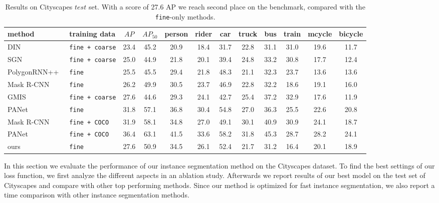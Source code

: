 \begin{table*}[ht!]
    \small
    \centering
    \begin{tabular}[t]{l|l|c c | c c c c c c c c}
         method & training data & $AP$ & $AP_{50}$ & person & rider & car & truck & bus & train & mcycle & bicycle \\
         \hline
         DIN~\cite{arnab2017pixelwise}          & \texttt{fine\,+\,coarse}  & 23.4 & 45.2 & 20.9 & 18.4 & 31.7 & 22.8 & 31.1 & 31.0 & 19.6 & 11.7 \\ 
         SGN~\cite{liu2017sgn}                  & \texttt{fine\,+\,coarse}  & 25.0 & 44.9 & 21.8 & 20.1 & 39.4 & 24.8 & 33.2 & 30.8 & 17.7 & 12.4 \\
         PolygonRNN++~\cite{acuna2018efficient} & \texttt{fine}             & 25.5 & 45.5 & 29.4 & 21.8 & 48.3 & 21.1 & 32.3 & 23.7 & 13.6 & 13.6 \\ 
         Mask R-CNN~\cite{he2017mask}           & \texttt{fine}             & 26.2 & 49.9 & 30.5 & 23.7 & 46.9 & 22.8 & 32.2 & 18.6 & 19.1 & 16.0 \\
         GMIS~\cite{liu2018affinity}            & \texttt{fine\,+\,coarse}  & 27.6 & 44.6 & 29.3 & 24.1 & 42.7 & 25.4 & 37.2 & 32.9 & 17.6 & 11.9 \\
         PANet~\cite{liu2018path}               & \texttt{fine}             & 31.8 & 57.1 & 36.8 & 30.4 & 54.8 & 27.0 & 36.3 & 25.5 & 22.6 & 20.8 \\
         Mask R-CNN~\cite{he2017mask}           & \texttt{fine\,+\,COCO}    & 31.9 & 58.1 & 34.8 & 27.0 & 49.1 & 30.1 & 40.9 & 30.9 & 24.1 & 18.7 \\   
         PANet~\cite{liu2018path}               & \texttt{fine\,+\,COCO}    & 36.4 & 63.1 & 41.5 & 33.6 & 58.2 & 31.8 & 45.3 & 28.7 & 28.2 & 24.1 \\
         \hline
         ours           & \texttt{fine}             & 27.6 & 50.9 & 34.5 & 26.1 & 52.4 & 21.7 & 31.2 & 16.4 & 20.1 & 18.9 \\
    \end{tabular}
    \vspace{3mm}
    \caption{Results on Cityscapes $test$ set. With a score of 27.6 AP we reach second place on the benchmark, compared with the \texttt{fine}-only methods.}
    \label{tab:results_cityscapes}
\end{table*}


In this section we evaluate the performance of our instance segmentation method on the Cityscapes dataset. To find the best settings of our loss function, we first analyze the different aspects in an ablation study. Afterwards we report results of our best model on the test set of Cityscapes and compare with other top performing methods. Since our method is optimized for fast instance segmentation, we also report a time comparison with other instance segmentation methods.


